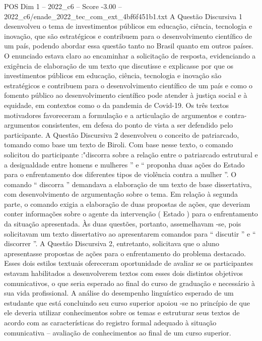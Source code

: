 \begin{textsample}{POS Dim 1 – 2022\_c6 – Score -3.00 – 2022\_c6/enade\_2022\_tec\_com\_ext\_4bf6f451b1.txt}
A Questão Discursiva 1 desenvolveu o tema de investimentos públicos em educação, ciência, tecnologia e inovação, que são estratégicos e contribuem para o desenvolvimento científico de um país, podendo abordar essa questão tanto no Brasil quanto em outros países.
O enunciado estava claro ao encaminhar a solicitação de resposta, evidenciando a exigência de elaboração de um texto que discutisse e explicasse por que os investimentos públicos em educação, ciência, tecnologia e inovação são estratégicos e contribuem para o desenvolvimento científico de um país e como o fomento público ao desenvolvimento científico pode atender à justiça social e à equidade, em contextos como o da pandemia de Covid-19.
Os três textos motivadores favoreceram a formulação e a articulação de argumentos e contra-argumentos consistentes, em defesa do ponto de vista a ser defendido pelo participante.
A Questão Discursiva 2 desenvolveu o conceito de patriarcado, tomando como base um texto de Biroli.
Com base nesse texto, o comando solicitou do participante :"discorra sobre a relação entre o patriarcado estrutural e a desigualdade entre homens e mulheres ” e “ proponha duas ações do Estado para o enfrentamento dos diferentes tipos de violência contra a mulher ”.
O comando “ discorra ” demandava a elaboração de um texto de base dissertativa, com desenvolvimento de argumentação sobre o tema.
Em relação à segunda parte, o comando exigia a elaboração de duas propostas de ações, que deveriam conter informações sobre o agente da intervenção ( Estado ) para o enfrentamento da situação apresentada.
Às duas questões, portanto, assemelhavam -se, pois solicitavam um texto dissertativo ao apresentarem comandos para “ discutir ” e “ discorrer ”.
A Questão Discursiva 2, entretanto, solicitava que o aluno apresentasse propostas de ações para o enfrentamento do problema destacado.
Esses dois estilos textuais ofereceram oportunidade de avaliar se os participantes estavam habilitados a desenvolverem textos com esses dois distintos objetivos comunicativos, o que seria esperado ao final do curso de graduação e necessário à sua vida profissional.
A análise do desempenho linguístico esperado de um estudante que está concluindo seu curso superior apoiou -se no princípio de que ele deveria utilizar conhecimentos sobre os temas e estruturar seus textos de acordo com as características do registro formal adequado à situação comunicativa – avaliação de conhecimentos ao final de um curso superior.

\end{textsample}
